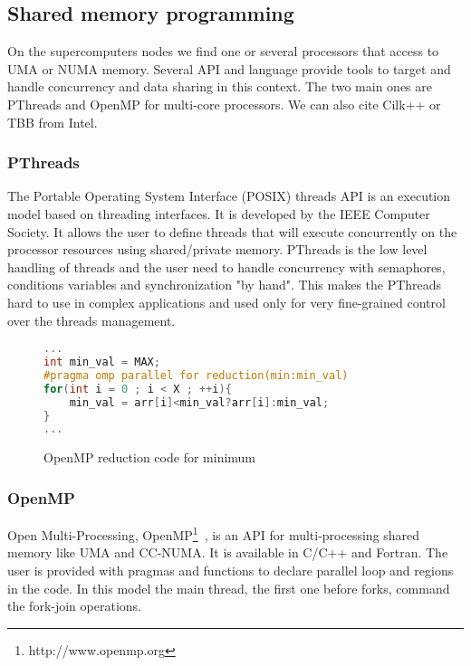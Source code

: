 \subsection{Shared memory programming}
On the supercomputers nodes we find one or several processors that access to UMA or NUMA memory. 
Several API and language provide tools to target and handle concurrency and data sharing in this context. 
The two main ones are PThreads and OpenMP for multi-core processors. 
We can also cite Cilk++ or TBB from Intel.

\subsubsection{PThreads}
The Portable Operating System Interface (POSIX) threads API is an execution model based on threading interfaces. 
It is developed by the IEEE Computer Society. 
It allows the user to define threads that will execute concurrently on the processor resources using shared/private memory.
PThreads is the low level handling of threads and the user need to handle concurrency with semaphores, conditions variables and synchronization "by hand".
This makes the PThreads hard to use in complex applications and used only for very fine-grained control over the threads management. 

\begin{figure}[t!]
\begin{lstlisting}[language=C]
...
int min_val = MAX;
#pragma omp parallel for reduction(min:min_val)
for(int i = 0 ; i < X ; ++i){
	min_val = arr[i]<min_val?arr[i]:min_val;
}
...
\end{lstlisting}
\caption{OpenMP reduction code for minimum}
\label{code:openmp_reduction}
\end{figure}


\subsubsection{OpenMP}
Open Multi-Processing, OpenMP\footnote{http://www.openmp.org}~\cite{chapman2008using,supinski2017scaling}, is an API for multi-processing shared memory like UMA and CC-NUMA.
It is available in C/C++ and Fortran.
The user is provided with pragmas and functions to declare parallel loop and regions in the code. 
In this model the main thread, the first one before forks, command the fork-join operations. 

